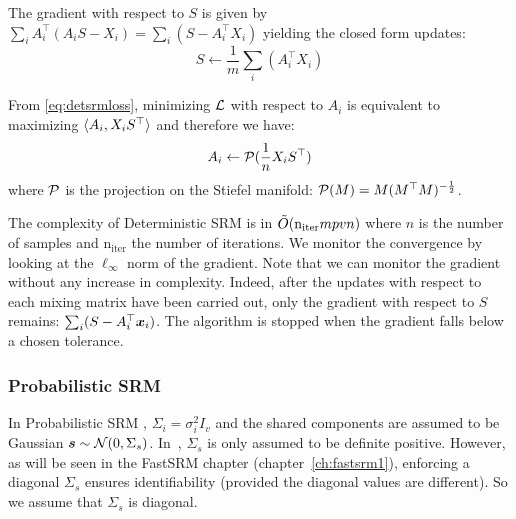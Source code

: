 The gradient with respect to $S$ is given by $\sum_i A_i^{\top}(A_i S -
X_i) = \sum_i (S -
A_i^{\top} X_i)$
yielding the closed form updates:
\begin{equation}
  S \leftarrow  \frac1m \sum_i (A_i^{\top} X_i)
  \label{eq:srm:supdate}
\end{equation}

From \eqref{eq:detsrmloss}, minimizing $\mathcal{L}$ with respect to $A_i$ is
equivalent to maximizing $\langle{ A_i},{ X_i S^{\top} }\rangle$ and therefore we
have:
\begin{equation}
  A_i \leftarrow  \mathcal{P}(\frac1{n}X_i S^{\top})
  \label{eq:detsrm:Aiupdate}
\end{equation}
where $\mathcal{P}$ is the projection on the Stiefel manifold: $\mathcal{P}(M) = M
(M^{\top}M)^{-\frac12}$.

The complexity of Deterministic SRM is in $\tilde{O}(\mathrm{n_{iter}} mpvn)$ where
$n$ is the number of samples and $\mathrm{n_{iter}}$ the number of iterations.
We monitor the convergence by looking at the $\ell_{\infty}$ norm of the
gradient. Note that we can monitor the gradient without any increase in complexity.
Indeed, after the updates with respect to each mixing matrix have been
carried out, only the gradient with respect to $S$ remains: $\sum_i
(S - A_i^{\top}\boldsymbol{x}_i)$. The algorithm is stopped when the
gradient falls below a chosen tolerance.

\subsubsection{Probabilistic SRM}
\label{sec:probabilisticsrm}
In Probabilistic SRM , $\Sigma_i=\sigma_i^2 I_v$ and the shared
components are assumed to be Gaussian $\boldsymbol{s} \sim \mathcal{N}(0, \Sigma_s)$.
In~\cite{chen2015reduced}, $\Sigma_s$ is only assumed to be definite positive. However,
as will be seen in the FastSRM chapter (chapter~\ref{ch:fastsrm1}), enforcing a diagonal $\Sigma_s$ ensures
identifiability (provided the diagonal values are different). So we assume that $\Sigma_s$ is diagonal.


